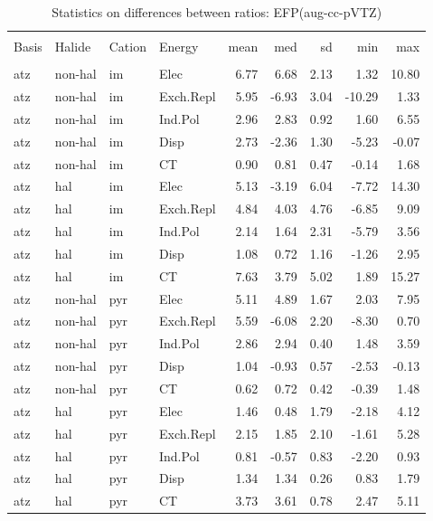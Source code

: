 \documentclass[a4paper]{article}
\begin{document}
\begin{table}[ht]
\centering
\begin{tabular}{llllrrrrr}
  \hline \\
Basis & Halide & Cation & Energy & mean & med & sd & min & max \\ 
  \hline \\
atz & non-hal & im & Elec & 6.77 & 6.68 & 2.13 & 1.32 & 10.80 \\ 
  atz & non-hal & im & Exch.Repl & 5.95 & -6.93 & 3.04 & -10.29 & 1.33 \\ 
  atz & non-hal & im & Ind.Pol & 2.96 & 2.83 & 0.92 & 1.60 & 6.55 \\ 
  atz & non-hal & im & Disp & 2.73 & -2.36 & 1.30 & -5.23 & -0.07 \\ 
  atz & non-hal & im & CT & 0.90 & 0.81 & 0.47 & -0.14 & 1.68 \\ 
  atz & hal & im & Elec & 5.13 & -3.19 & 6.04 & -7.72 & 14.30 \\ 
  atz & hal & im & Exch.Repl & 4.84 & 4.03 & 4.76 & -6.85 & 9.09 \\ 
  atz & hal & im & Ind.Pol & 2.14 & 1.64 & 2.31 & -5.79 & 3.56 \\ 
  atz & hal & im & Disp & 1.08 & 0.72 & 1.16 & -1.26 & 2.95 \\ 
  atz & hal & im & CT & 7.63 & 3.79 & 5.02 & 1.89 & 15.27 \\ 
  atz & non-hal & pyr & Elec & 5.11 & 4.89 & 1.67 & 2.03 & 7.95 \\ 
  atz & non-hal & pyr & Exch.Repl & 5.59 & -6.08 & 2.20 & -8.30 & 0.70 \\ 
  atz & non-hal & pyr & Ind.Pol & 2.86 & 2.94 & 0.40 & 1.48 & 3.59 \\ 
  atz & non-hal & pyr & Disp & 1.04 & -0.93 & 0.57 & -2.53 & -0.13 \\ 
  atz & non-hal & pyr & CT & 0.62 & 0.72 & 0.42 & -0.39 & 1.48 \\ 
  atz & hal & pyr & Elec & 1.46 & 0.48 & 1.79 & -2.18 & 4.12 \\ 
  atz & hal & pyr & Exch.Repl & 2.15 & 1.85 & 2.10 & -1.61 & 5.28 \\ 
  atz & hal & pyr & Ind.Pol & 0.81 & -0.57 & 0.83 & -2.20 & 0.93 \\ 
  atz & hal & pyr & Disp & 1.34 & 1.34 & 0.26 & 0.83 & 1.79 \\ 
  atz & hal & pyr & CT & 3.73 & 3.61 & 0.78 & 2.47 & 5.11 \\ 
   \hline
\end{tabular}
\caption{Statistics on differences between ratios: EFP(aug-cc-pVTZ)}
\end{table}
\end{document}

